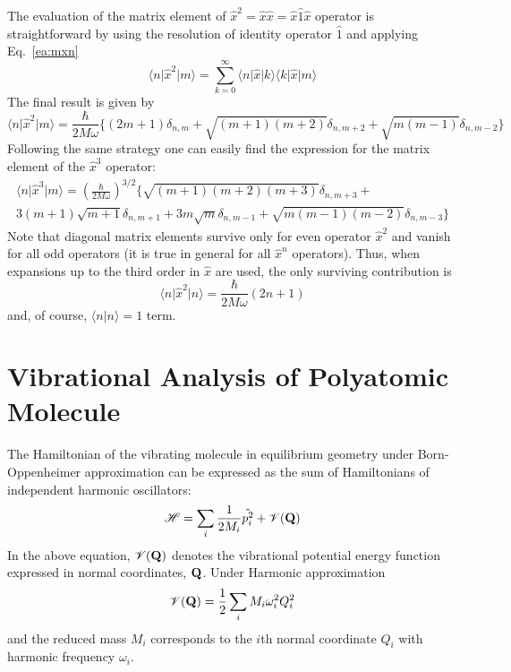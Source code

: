 \documentclass[a4paper,titlepage,twoside,fleqn,12pt]{book}
\begin{document}
\begin{appendices}
The evaluation of the matrix element of $\hat{x}^2=\hat{x}\hat{x}=\hat{x}\hat{1}\hat{x}$ 
operator is straightforward
by using the resolution of identity operator $\hat{1}$ and applying Eq.~\eqref{ea:mxn}
%
\begin{equation}
\langle n \vert \hat{x}^2 \vert m \rangle = 
\sum_{k=0}^{\infty} \langle n \vert \hat{x} \vert k \rangle \langle k \vert \hat{x} \vert m \rangle
\end{equation}
%
The final result is given by
%
\begin{equation} \label{ea:mxxn}
\langle n \vert \hat{x}^2 \vert m \rangle = 
\frac{\hbar}{2M\omega}
\Big\{ 
   (2m+1) \delta_{n,m} + \sqrt{(m+1)(m+2)} \delta_{n,m+2} + %
                         \sqrt{m(m-1)} \delta_{n,m-2}
\Big\}
\end{equation}
%
Following the same strategy one can easily find the expression for 
the matrix element of the $\hat{x}^3$ operator:
%
\begin{multline}
\label{ea:mxxxn}
\langle n \vert \hat{x}^3 \vert m \rangle = 
\left(
\frac{\hbar}{2M\omega}
\right)^{3/2}
\Big\{ 
   \sqrt{(m+1)(m+2)(m+3)} \delta_{n,m+3} + \\
   3(m+1)\sqrt{m+1} \delta_{n,m+1}
      +3m\sqrt{m}   \delta_{n,m-1} + \sqrt{m(m-1)(m-2)} \delta_{n,m-3}
\Big\}
\end{multline}
%
Note that diagonal matrix elements survive only for even operator $\hat{x}^2$
and vanish for all odd operators (it is true in general for all $\hat{x}^n$
operators). Thus, when expansions up to the third order in $\hat{x}$ are 
used, the only surviving contribution is
%
\begin{equation}
\label{ea:mxm}
\langle n \vert \hat{x}^2 \vert n \rangle = 
\frac{\hbar}{2M\omega}(2n+1)
\end{equation}
%
and, of course, $\langle n \vert n \rangle=1$ term.

\section{Vibrational Analysis of Polyatomic Molecule\label{asec:vibranal}}

The Hamiltonian of the vibrating molecule in equilibrium geometry under Born\hyp{}Oppenheimer approximation
can be expressed as the sum of Hamiltonians of independent harmonic oscillators:
\begin{equation}
\mathscr{H} = \sum_i \frac{1}{2M_i}\hat{{p}_i^2} + \mathscr{V}({\bf Q})
\end{equation}
In the above equation, $\mathscr{V}({\bf Q})$ denotes the vibrational potential energy function
expressed in normal coordinates, ${\bf Q}$. Under Harmonic approximation
\begin{equation}
\mathscr{V}({\bf Q}) = \frac{1}{2} \sum_i M_i \omega_i^2 Q_i^2
\end{equation}
and the reduced mass $M_i$ corresponds to the $i$th normal coordinate $Q_i$ with
harmonic frequency $\omega_i$.


\end{appendices}
\end{document}
